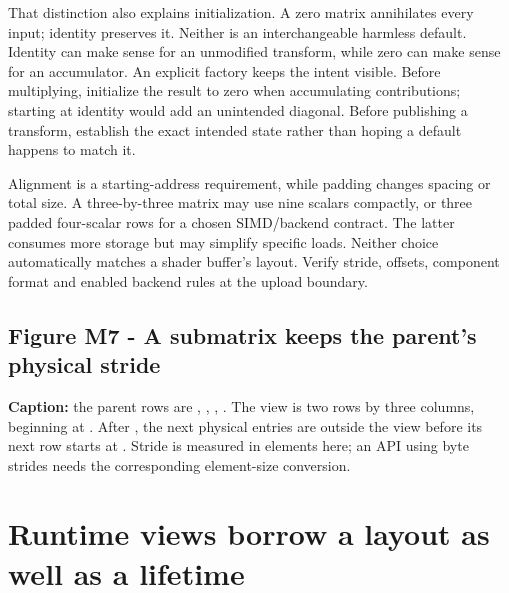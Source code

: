 That distinction also explains initialization. A zero matrix annihilates every input; identity preserves it. Neither is an interchangeable harmless default. Identity can make sense for an unmodified transform, while zero can make sense for an accumulator. An explicit  factory keeps the intent visible. Before multiplying, initialize the result to zero when accumulating contributions; starting at identity would add an unintended diagonal. Before publishing a transform, establish the exact intended state rather than hoping a default happens to match it.

Alignment is a starting-address requirement, while padding changes spacing or total size. A three-by-three matrix may use nine scalars compactly, or three padded four-scalar rows for a chosen SIMD/backend contract. The latter consumes more storage but may simplify specific loads. Neither choice automatically matches a shader buffer's layout. Verify stride, offsets, component format and enabled backend rules at the upload boundary.

\subsection{Figure M7 - A submatrix keeps the parent's physical stride}\label{02-foundations-ii-ch038-figure-m7---a-submatrix-keeps-the-parents-physical-stride}

\hypertarget{02-foundations-ii-ch038-figure-m7---a-submatrix-keeps-the-parents-physical-stride}{}


\textbf{Caption:} the parent rows are , , , . The view is two rows by three columns, beginning at . After , the next physical entries  are outside the view before its next row starts at . Stride is measured in elements here; an API using byte strides needs the corresponding element-size conversion.

\section{Runtime views borrow a layout as well as a lifetime}\label{02-foundations-ii-ch038-runtime-views-borrow-a-layout-as-well-as-a-lifetime}

